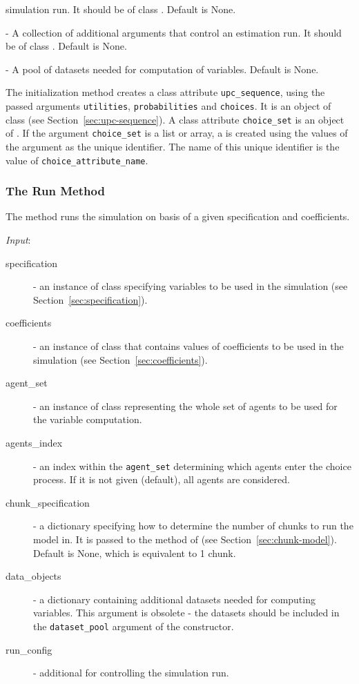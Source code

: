 {\begin{description}
  simulation run. It should be of class . Default is None.
\item[estimate_config] - A collection of additional arguments that control an
  estimation run. It should be of class . Default is None.
\item[dataset_pool] - A pool of datasets needed for computation of variables. Default is None.
\end{description}
The initialization method creates a class attribute \attributesindex \verb|upc_sequence|, using
the passed arguments \verb|utilities|, \verb|probabilities| and
\verb|choices|. It is an object of class  (see
Section~\ref{sec:upc-sequence}). A class attribute \attributesindex \verb|choice_set| is an
object of . \datasetindex If the argument \verb|choice_set| is a list or
array, a  \datasetindex is created using the values of the argument as the
unique identifier. The name of this unique identifier is the value of \verb|choice_attribute_name|. \attributesindex

\subsubsection{The Run Method}
%
The  method runs the simulation on basis of a given specification
and coefficients. \coefficientsindex

{\it Input}:
\begin{description}
\item[specification] - an instance of class 
  specifying variables \variablesindex to be used in the simulation (see Section~\ref{sec:specification}).
\item[coefficients] - an instance of class  \coefficientsindex that contains
  values of coefficients \coefficientsindex to be used in the simulation (see Section~\ref{sec:coefficients}).
\item[agent_set] - an instance of class  \datasetindex representing the whole
  set of agents to be used for the variable \variablesindex computation.
\item[agents_index] - an index within the \verb|agent_set| determining which
  agents enter the choice process. If it is not given (default), all agents are
  considered.
\item[chunk_specification] - a dictionary specifying how to determine the number
  of chunks to run the model in. It is  passed to the  method of 
   (see Section~\ref{sec:chunk-model}). 
  Default is None, which is equivalent to 1 chunk.
\item[data_objects] - a dictionary containing additional datasets \datasetindex 
  needed for computing variables. \variablesindex This argument is obsolete - the datasets should be 
  included in the \verb|dataset_pool| argument of the constructor.
\item[run_config] - additional  for controlling the
  simulation run.
\end{description}


}
